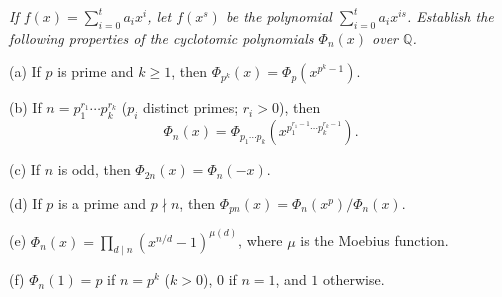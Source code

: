 \begin{problem}\em
If $f(x)=\sum_{i=0}^{t}a_i x^i$, let $f(x^s)$ be the polynomial $\sum_{i=0}^{t}a_i x^{is}$. Establish the following properties of the cyclotomic polynomials $\Phi_n(x)$ over $\mathbb{Q}$.\par
(a) If $p$ is prime and $k\geq 1$, then $\Phi_{p^k}(x)=\Phi_p(x^{p^k-1})$.\par
(b) If $n=p_1^{r_1}\cdots p_k^{r_k}$ ($p_i$ distinct primes; $r_i>0$), then 
$$\Phi_n(x)=\Phi_{p_1\cdots p_k}(x^{p_1^{r_1-1}\cdots p_k^{r_k-1}}).$$\par
(c) If $n$ is odd, then $\Phi_{2n}(x)=\Phi_n(-x)$.\par
(d) If $p$ is a prime and $p\nmid n$, then $\Phi_{pn}(x)=\Phi_n(x^p)/\Phi_n(x)$.\par
(e) $\Phi_n(x)=\prod_{d\mid n}(x^{n/d}-1)^{\mu(d)}$, where $\mu$ is the Moebius function.\par
(f) $\Phi_n(1)=p$ if $n=p^k$ ($k>0$), $0$ if $n=1$, and $1$ otherwise.
\end{problem}
